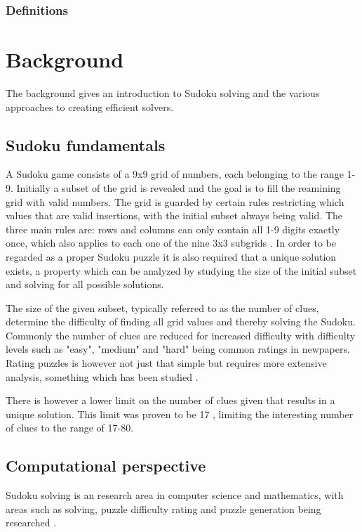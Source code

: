 \documentclass[a4paper,11pt]{kth-mag}
\begin{document}
\subsection{Definitions}

\chapter{Background}
The background gives an introduction to Sudoku solving and the various approaches to creating efficient solvers.

\FloatBarrier
\section{Sudoku fundamentals}
A Sudoku game consists of a 9x9 grid of numbers, each belonging to the range 1-9.
Initially a subset of the grid is revealed and the goal is to fill the reamining grid with valid numbers.
The grid is guarded by certain rules restricting which values that are valid insertions, with the initial subset always being valid.
The three main rules are: rows and columns can only contain all 1-9 digits exactly once, which also applies to each one of the nine 3x3 subgrids \cite{17clueProof}.
In order to be regarded as a proper Sudoku puzzle it is also required that a unique solution exists, a property which can be analyzed by studying the size of the initial subset and solving for all possible solutions.

The size of the given subset, typically referred to as the number of clues, determine the difficulty of finding all grid values and thereby solving the Sudoku.
Commonly the number of clues are reduced for increased difficulty with difficulty levels such as "easy", "medium" and "hard" being common ratings in newpapers.
Rating puzzles is however not just that simple but requires more extensive analysis, something which has been studied \cite{sudokuDifficulty}.

There is however a lower limit on the number of clues given that results in a unique solution.
This limit was proven to be 17 \cite{17clueProof}, limiting the interesting number of clues to the range of 17-80.

\FloatBarrier
\section{Computational perspective}
Sudoku solving is an research area in computer science and mathematics, with areas such as solving, puzzle difficulty rating and puzzle generation being researched \cite{stochastic, sudokuConstruct, generation}.%
\end{document}
